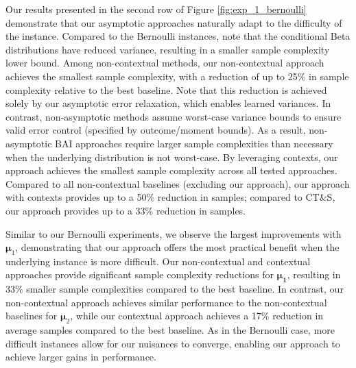 \documentclass{article}
\begin{document}
Our results presented in the second row of Figure \ref{fig:exp_1_bernoulli} demonstrate that our asymptotic approaches naturally adapt to the difficulty of the instance. Compared to the Bernoulli instances, note that the conditional Beta distributions have reduced variance, resulting in a smaller sample complexity lower bound. Among non-contextual methods, our non-contextual approach achieves the smallest sample complexity, with a reduction of up to 25\% in sample complexity relative to the best baseline. Note that this reduction is achieved solely by our asymptotic error relaxation, which enables learned variances. In contrast, non-asymptotic methods assume worst-case variance bounds to ensure valid error control (specified by outcome/moment bounds). As a result, non-asymptotic BAI approaches require larger sample complexities than necessary when the underlying distribution is not worst-case. By leveraging contexts, our approach achieves the smallest sample complexity across all tested approaches. Compared to all non-contextual baselines (excluding our approach), our approach with contexts provides up to a 50\% reduction in samples; compared to CT\&S, our approach provides up to a 33\% reduction in samples. 

Similar to our Bernoulli experiments, we observe the largest improvements with $\bm{\mu}_1$, demonstrating that our approach offers the most practical benefit when the underlying instance is more difficult. Our non-contextual and contextual approaches provide significant sample complexity reductions for $\bm{\mu_1}$, resulting in 33\% smaller sample complexities compared to the best baseline. In contrast, our non-contextual approach achieves similar performance to the non-contextual baselines for $\bm{\mu}_2$, while our contextual approach achieves a 17\% reduction in average samples compared to the best baseline. As in the Bernoulli case, more difficult instances allow for our nuisances to converge, enabling our approach to achieve larger gains in performance. 






\end{document}
